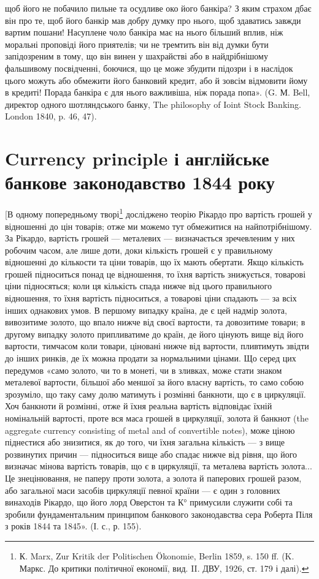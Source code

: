 \parcont{}  %
щоб його не побачило пильне та осудливе око його банкіра? З яким страхом
дбає він про те, щоб його банкір мав добру думку про нього, щоб здаватись
завжди вартим пошани! Насуплене чоло банкіра має на нього більший вплив,
ніж моральні проповіді його приятелів; чи не тремтить він від думки бути запідозреним
в тому, що він винен у шахрайстві або в найдрібнішому фальшивому
посвідченні, боючися, що це може збудити підозри і в наслідок цього можуть
або обмежити його банковий кредит, або й зовсім відмовити йому в кредиті!
Порада банкіра є для нього важливіша, ніж порада попа». (G. М. Bell, директор
одного шотляндського банку, The philosophy of Ioint Stock Banking. London 1840,
p. 46, 47).

\section{
Currency principle і англійське банкове законодавство
1844 року}

[В одному попередньому творі\footnote{
К. Marx, Zur Kritik der Politischen Ökonomie, Berlin 1859, s. 150 ff. (K. Маркс. До критики
політичної економії, вид. II. ДВУ, 1926, ст. 179 і далі).
} досліджено теорію Рікардо про вартість
грошей у відношенні до цін товарів; отже ми можемо тут обмежитися на найпотрібнішому.
За Рікардо, вартість грошей — металевих — визначається зречевленим
у них робочим часом, але лише доти, доки кількість грошей є у правильному
відношенні до кількости та ціни товарів, що їх мають обертати. Якщо
кількість грошей підноситься понад це відношення, то їхня вартість знижується,
товарові ціни підносяться; коли ця кількість спада нижче від цього правильного
відношення, то їхня вартість підноситься, а товарові ціни спадають — за всіх інших
однакових умов. В першому випадку країна, де є цей надмір золота,
вивозитиме золото, що впало нижче від своєї вартости, та довозитиме товари;
в другому випадку золото припливатиме до країн, де його цінують вище від його
вартости, тимчасом коли товари, ціновані нижче від вартости, пливтимуть звідти
до інших ринків, де їх можна продати за нормальними цінами. Що серед цих
передумов «само золото, чи то в монеті, чи в зливках, може стати знаком металевої
вартости, більшої або меншої за його власну вартість, то само собою
зрозуміло, що таку саму долю матимуть і розмінні банкноти, що є в циркуляції.
Хоч банкноти й розмінні, отже й їхня реальна вартість відповідає їхній номінальній
вартості, проте вся маса грошей в циркуляції, золота й банкнот (the
aggregate currency consisting of metal and of convertible notes), може ціною піднестися
або знизитися, як до того, чи їхня загальна кількість — з вище розвинутих
причин — підноситься вище або спадає нижче від рівня, що його визначає
мінова вартість товарів, що є в циркуляції, та металева вартість золота... Це
знецінювання, не паперу проти золота, а золота й паперових грошей разом, або
загальної маси засобів циркуляції певної країни — є один з головних винаходів
Рікардо, що його лорд Оверстон та К° примусили служити собі та зробили фундаментальним
принципом банкового законодавства сера Роберта Піля з років
1844 та 1845». (І. с., р. 155).


